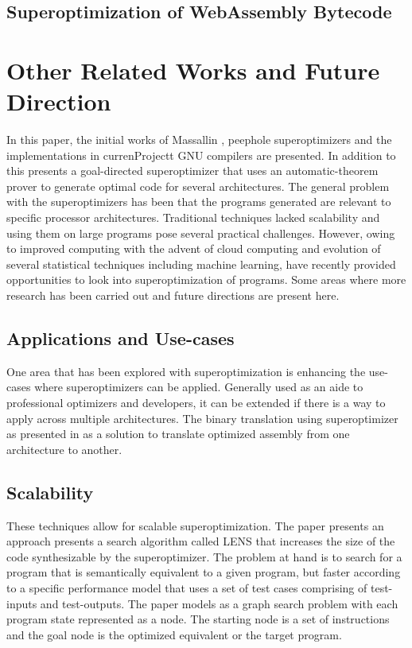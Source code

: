 \documentclass[sigconf]{acmart}
\begin{document}
\subsection{Superoptimization of WebAssembly Bytecode}


\section{Other Related Works and Future Direction}

In this paper, the initial works of Massallin \cite{superopt87}, peephole superoptimizers \cite{peephole2006} and the implementations in currenProjectt GNU compilers are presented. In addition to this \cite{denali2001} presents a goal-directed superoptimizer that uses an automatic-theorem prover to generate optimal code for several architectures. The general problem with the superoptimizers has been that the programs generated are relevant to specific processor architectures. Traditional techniques lacked scalability and using them on large programs pose several practical challenges. However, owing to improved computing with the advent of cloud computing and evolution of several statistical techniques including machine learning, have recently provided opportunities to look into superoptimization of programs. Some areas where more research has been carried out and future directions are present here.

\subsection{Applications and Use-cases}

One area that has been explored with superoptimization is enhancing the use-cases where superoptimizers can be applied. Generally used as an aide to professional optimizers and developers, it can be extended if there is a way to apply across multiple architectures. The binary translation using superoptimizer as presented in \cite{BTLpeephole} as a solution to translate optimized assembly from one architecture to another. 

\subsection{Scalability}
These techniques allow for scalable superoptimization. The paper \cite{scaleup} presents an approach presents a search algorithm called LENS that increases the size of the code synthesizable by the superoptimizer. The problem at hand is to search for a program that is semantically equivalent to a given program, but faster according to a specific performance model that uses a set of test cases comprising of test-inputs and test-outputs. The paper \cite{scaleup} models as a graph search problem with each program state represented as a node. The starting node is a set of instructions and the goal node is the optimized equivalent or the target program.
\end{document}
